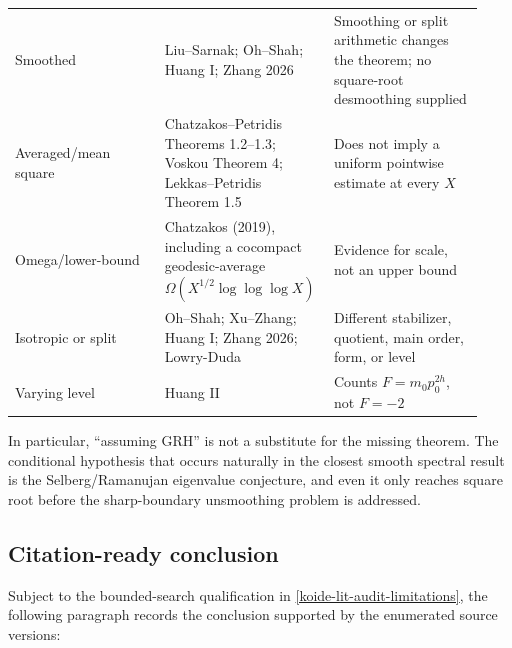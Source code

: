 \begin{longtable}[]{@{}
  >{\raggedright\arraybackslash}p{0.31\linewidth}
  >{\raggedright\arraybackslash}p{0.31\linewidth}
  >{\raggedright\arraybackslash}p{0.31\linewidth}@{}}
Smoothed & Liu--Sarnak; Oh--Shah; Huang I; Zhang 2026 & Smoothing or split arithmetic changes the theorem; no square-root desmoothing supplied \\
Averaged/mean square & Chatzakos--Petridis Theorems 1.2--1.3; Voskou Theorem 4; Lekkas--Petridis Theorem 1.5 & Does not imply a uniform pointwise estimate at every \(X\) \\
Omega/lower-bound & Chatzakos (2019), including a cocompact geodesic-average \(\Omega(X^{1/2}\log\log\log X)\) & Evidence for scale, not an upper bound \\
Isotropic or split & Oh--Shah; Xu--Zhang; Huang I; Zhang 2026; Lowry-Duda & Different stabilizer, quotient, main order, form, or level \\
Varying level & Huang II & Counts \(F=m_0p_0^{2h}\), not \(F=-2\) \\
\end{longtable}

In particular, ``assuming GRH'' is not a substitute for the missing theorem. The conditional hypothesis that occurs naturally in the closest smooth spectral result is the Selberg/Ramanujan eigenvalue conjecture, and even it only reaches square root before the sharp-boundary unsmoothing problem is addressed.

\subsection{Citation-ready conclusion}\label{koide-lit-citation-ready-conclusion}

Subject to the bounded-search qualification in
\cref{koide-lit-audit-limitations}, the following paragraph records the
conclusion supported by the enumerated source versions:

